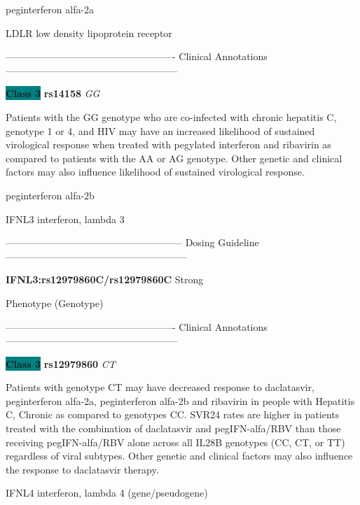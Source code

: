 \documentclass{resume} %
\begin{document}
\begin{rSection}{ peginterferon alfa-2a }
\begin{rSubsection}{ LDLR }{ low density lipoprotein receptor }{}{}
\item[] ---------------------------------------------------- Clinical Annotations -----------------------------------------------------\newline
\item \textbf{\colorbox{teal} {Class 3}} \textbf{ rs14158 } \textit{ GG }
\item[] Patients with the GG genotype who are co-infected with chronic hepatitis C, genotype 1 or 4, and HIV may have an increased likelihood of sustained virological response when treated with pegylated interferon and ribavirin as compared to patients with the AA or AG genotype. Other genetic and clinical factors may also influence likelihood of sustained virological response. 
\end{rSubsection}

\end{rSection}\begin{rSection}{ peginterferon alfa-2b }
\item[]

\begin{rSubsection}{ IFNL3 }{ interferon, lambda 3 }{}{}
\item[]
\item[] ------------------------------------------------------ Dosing Guideline --------------------------------------------------------\newline
\item[]
\item[] \textbf{ IFNL3:rs12979860C/rs12979860C } Strong
\item[] Phenotype (Genotype)\newline
\item[] 
\item[] ---------------------------------------------------- Clinical Annotations -----------------------------------------------------\newline
\item \textbf{\colorbox{teal} {Class 3}} \textbf{ rs12979860 } \textit{ CT }
\item[] Patients with genotype CT may have decreased response to daclatasvir, peginterferon alfa-2a, peginterferon alfa-2b and ribavirin in people with Hepatitis C, Chronic as compared to genotypes CC. SVR24 rates are higher in patients treated with the combination of daclatasvir and pegIFN-alfa/RBV than those receiving pegIFN-alfa/RBV alone across all IL28B genotypes (CC, CT, or TT) regardless of viral subtypes. Other genetic and clinical factors may also influence the response to daclatasvir therapy.
\end{rSubsection}\begin{rSubsection}{ IFNL4 }{ interferon, lambda 4 (gene/pseudogene) }{}{}
\item[]


\end{rSubsection}
\end{rSection}
\end{document}
